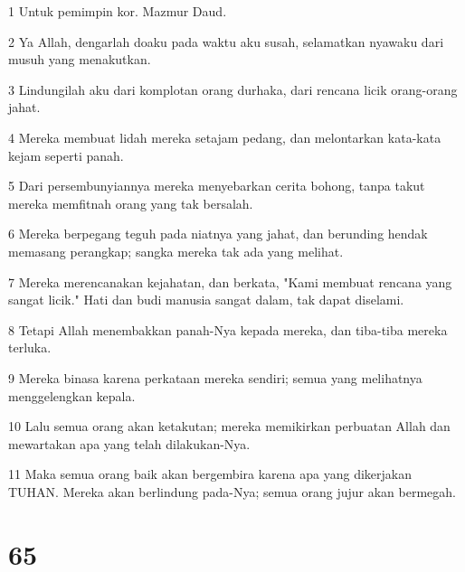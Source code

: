 \par 1 Untuk pemimpin kor. Mazmur Daud.
\par 2 Ya Allah, dengarlah doaku pada waktu aku susah, selamatkan nyawaku dari musuh yang menakutkan.
\par 3 Lindungilah aku dari komplotan orang durhaka, dari rencana licik orang-orang jahat.
\par 4 Mereka membuat lidah mereka setajam pedang, dan melontarkan kata-kata kejam seperti panah.
\par 5 Dari persembunyiannya mereka menyebarkan cerita bohong, tanpa takut mereka memfitnah orang yang tak bersalah.
\par 6 Mereka berpegang teguh pada niatnya yang jahat, dan berunding hendak memasang perangkap; sangka mereka tak ada yang melihat.
\par 7 Mereka merencanakan kejahatan, dan berkata, "Kami membuat rencana yang sangat licik." Hati dan budi manusia sangat dalam, tak dapat diselami.
\par 8 Tetapi Allah menembakkan panah-Nya kepada mereka, dan tiba-tiba mereka terluka.
\par 9 Mereka binasa karena perkataan mereka sendiri; semua yang melihatnya menggelengkan kepala.
\par 10 Lalu semua orang akan ketakutan; mereka memikirkan perbuatan Allah dan mewartakan apa yang telah dilakukan-Nya.
\par 11 Maka semua orang baik akan bergembira karena apa yang dikerjakan TUHAN. Mereka akan berlindung pada-Nya; semua orang jujur akan bermegah.

\chapter{65}

